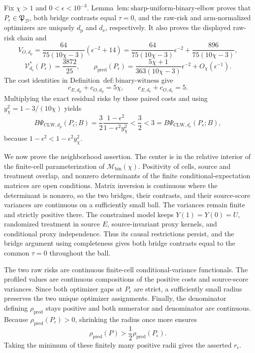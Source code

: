 Fix \(\chi>1\) and \(0<\epsilon<10^{-3}\). Lemma~\(\mathrm{lem{:}sharp\text{-}uniform\text{-}binary\text{-}elbow}\) proves that \(P_\epsilon\in\mathfrak P_{\mathcal D}\), both bridge contrasts equal \(\tau=0\), and the raw-risk and arm-normalized optimizers are uniquely \(d_{\mathrm p}\) and \(d_{\mathrm e}\), respectively. It also proves the displayed raw-risk chain and
\[
 V_{O,d_{\mathrm p}}
 =\frac{64}{75(10\chi-3)}(\epsilon^{-2}+14)
 =\frac{64}{75(10\chi-3)}\epsilon^{-2}
 +\frac{896}{75(10\chi-3)}, \tag{1}
\]
\[
 \mathcal V_{d_{\mathrm e}}^*(P_\epsilon)=\frac{3872}{25},
 \qquad
 \rho_{\mathrm{pred}}(P_\epsilon)
 =\frac{5\chi+1}{363(10\chi-3)}\epsilon^{-2}+O_\chi(\epsilon^{-1}). \tag{2}
\]
The cost identities in Definition~\(\mathrm{def{:}binary\text{-}witness}\) give
\[
 c_{E,d_{\mathrm p}}+c_{O,d_{\mathrm p}}=5\chi,
 \qquad c_{E,d_{\mathrm e}}+c_{O,d_{\mathrm e}}=5. \tag{3}
\]
Multiplying the exact residual risks by these paired costs and using \(y_\chi^2=1-3/(10\chi)\) yields
\[
 B\Psi_{\mathrm{CLW},d_{\mathrm p}}(P_\epsilon;B)
 =\frac32\frac{1-\epsilon^2}{1-\epsilon^2y_\chi^2}
 <\frac32<3
 =B\Psi_{\mathrm{CLW},d_{\mathrm e}}(P_\epsilon;B), \tag{4}
\]
because \(1-\epsilon^2<1-\epsilon^2y_\chi^2\).

We now prove the neighborhood assertion. The center is in the relative interior of the finite-cell parameterization of \(\mathcal M_{\mathrm{bin}}(\chi)\). Positivity of cells, source and treatment overlap, and nonzero determinants of the finite conditional-expectation matrices are open conditions. Matrix inversion is continuous where the determinant is nonzero, so the two bridges, their contrasts, and their source-score variances are continuous on a sufficiently small ball. The variances remain finite and strictly positive there. The constrained model keeps \(Y(1)=Y(0)=U\), randomized treatment in source \(E\), source-invariant proxy kernels, and conditional proxy independence. Thus its causal restrictions persist, and the bridge argument using completeness gives both bridge contrasts equal to the common \(\tau=0\) throughout the ball.

The two raw risks are continuous finite-cell conditional-variance functionals. The profiled values are continuous compositions of the positive costs and source-score variances. Since both optimizer gaps at \(P_\epsilon\) are strict, a sufficiently small radius preserves the two unique optimizer assignments. Finally, the denominator defining \(\rho_{\mathrm{pred}}\) stays positive and both numerator and denominator are continuous. Because \(\rho_{\mathrm{pred}}(P_\epsilon)>0\), shrinking the radius once more ensures
\[
 \rho_{\mathrm{pred}}(P)>\frac12\rho_{\mathrm{pred}}(P_\epsilon).
\]
Taking the minimum of these finitely many positive radii gives the asserted \(r_\epsilon\).